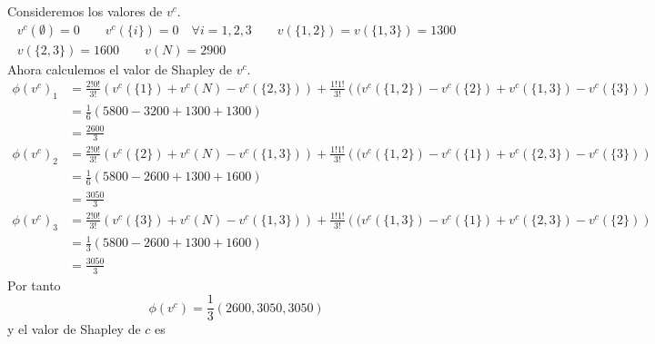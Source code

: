 \documentclass[twoside]{article}
\begin{document}
\begin{solucion}
Consideremos  los valores de $v^c$.
\begin{gather*}
v^c(\emptyset) = 0 \qquad v^c(\{i\}) = 0 \quad \forall i = 1,2,3 \qquad  v(\{1,2\}) = v(\{1,3\}) = 1300\\
v(\{2,3\}) = 1600 \qquad v(N)=2900
\end{gather*}
Ahora calculemos el valor de Shapley de $v^c$. 
\begin{align*}
\phi(v^c)_1& = \frac{2!0!}{3!}(v^c(\{1\})+ v^c(N) -v^c(\{2,3\})) + \frac{1!1!}{3!}\left((v^c(\{1,2\})-v^c(\{2\}) + v^c(\{1,3\})-v^c(\{3\}) \right)\\
&= \frac{1}{6}(5800-3200 + 1300 + 1300)\\& = \frac{2600}{3}\\
\phi(v^c)_2& = \frac{2!0!}{3!}(v^c(\{2\})+ v^c(N) -v^c(\{1,3\})) + \frac{1!1!}{3!}\left((v^c(\{1,2\})-v^c(\{1\}) + v^c(\{2,3\})-v^c(\{3\}) \right)\\
&= \frac{1}{6}(5800-2600 + 1300 + 1600)\\& = \frac{3050}{3}\\
\phi(v^c)_3& = \frac{2!0!}{3!}(v^c(\{3\})+ v^c(N) -v^c(\{1,3\})) + \frac{1!1!}{3!}\left((v^c(\{1,3\})-v^c(\{1\}) + v^c(\{2,3\})-v^c(\{2\}) \right)\\
&= \frac{1}{3}(5800-2600 + 1300 + 1600)\\& = \frac{3050}{3}
\end{align*}
Por tanto
$$
\phi(v^c) = \frac{1}{3}(2600,3050,3050)
$$
y el valor de Shapley de $c$ es
\end{solucion}
\end{document}
